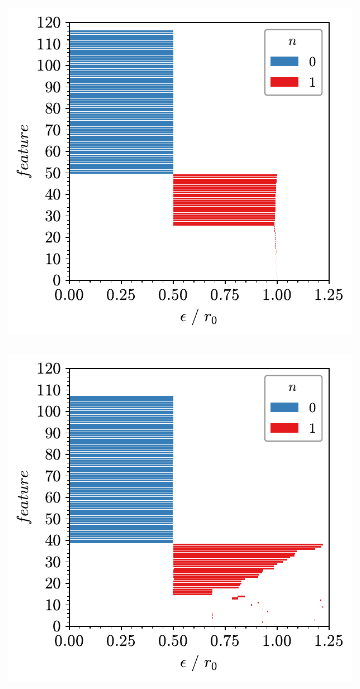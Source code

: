 \begin{figure}[tbp]
	\centering
     
      \begin{subfigure}[b]{0.45\textwidth}
         \centering
         \includegraphics[width=\textwidth]{./figures/ph/ex_c_barcode.pdf}
         \caption{}
         \label{fig:exvisa}
     \end{subfigure}
     \hfill
     \begin{subfigure}[b]{0.45\textwidth}
         \centering
         \includegraphics[width=\textwidth]{./figures/ph/ex_a_barcode.pdf}
         \caption{}
         \label{fig:exvisb}
     \end{subfigure}
     \hfill
     

\end{figure}

